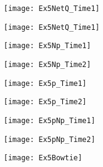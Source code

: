 \begin{landscape}
\begin{figure}[!htp]
\centering
\texttt{[image: Ex5NetQ\_Time1]}
\caption{} 
\label{}
\end{figure}
\end{landscape}

\begin{landscape}
\begin{figure}[!htp]
\centering
\texttt{[image: Ex5NetQ\_Time1]}
\caption{} 
\label{}
\end{figure}
\end{landscape}

\begin{landscape}
\begin{figure}[!htp]
\centering
\texttt{[image: Ex5Np\_Time1]}
\caption{} 
\label{}
\end{figure}
\end{landscape}

\begin{landscape}
\begin{figure}[!htp]
\centering
\texttt{[image: Ex5Np\_Time2]}
\caption{} 
\label{}
\end{figure}
\end{landscape}

\begin{landscape}
\begin{figure}[!htp]
\centering
\texttt{[image: Ex5p\_Time1]}
\caption{} 
\label{}
\end{figure}
\end{landscape}

\begin{landscape}
\begin{figure}[!htp]
\centering
\texttt{[image: Ex5p\_Time2]}
\caption{} 
\label{}
\end{figure}
\end{landscape}


\begin{landscape}
\begin{figure}[!htp]
\centering
\texttt{[image: Ex5pNp\_Time1]}
\caption{} 
\label{}
\end{figure}
\end{landscape}

\begin{landscape}
\begin{figure}[!htp]
\centering
\texttt{[image: Ex5pNp\_Time2]}
\caption{} 
\label{}
\end{figure}
\end{landscape}



\begin{figure}[!htp]
\centering
\texttt{[image: Ex5Bowtie]}
\caption{} 
\label{}
\end{figure}


